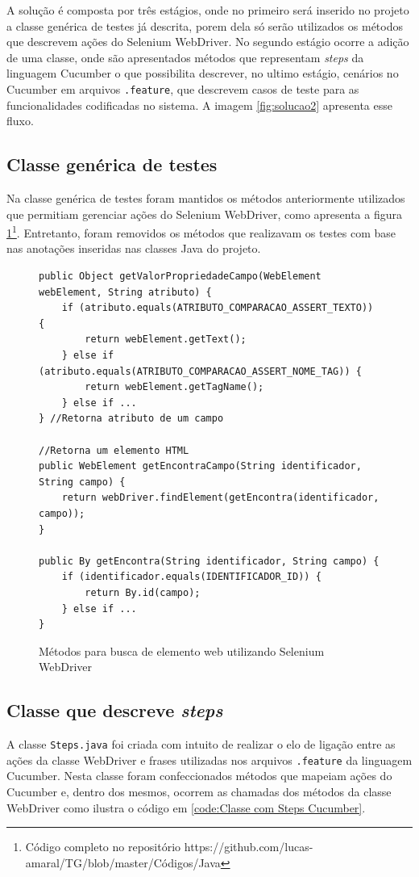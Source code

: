 \documentclass[tg]{mdtufsm}
\begin{document}
A solução é composta por três estágios, onde no primeiro será inserido no projeto a classe genérica de testes já descrita, porem dela só serão utilizados os métodos que descrevem ações do Selenium WebDriver. No segundo estágio ocorre a adição de uma classe, onde são apresentados métodos que representam \emph{steps} da linguagem Cucumber o que possibilita descrever, no ultimo estágio, cenários no Cucumber em arquivos \texttt{.feature}, que descrevem casos de teste para as funcionalidades codificadas no sistema. A imagem \ref{fig:solucao2} apresenta esse fluxo.

\subsection{Classe genérica de testes}
Na classe genérica de testes foram mantidos os métodos anteriormente utilizados que permitiam gerenciar ações do Selenium WebDriver, como apresenta a figura \ref{code:Classe genérica contendo métodos WebDriver}\footnote{Código completo no repositório https://github.com/lucas-amaral/TG/blob/master/Códigos/Java}.
Entretanto, foram removidos os métodos que realizavam os testes com base nas anotações inseridas nas classes Java do projeto.

\begin{figure}[!htt]
	\begin{lstlisting}
public Object getValorPropriedadeCampo(WebElement webElement, String atributo) {
    if (atributo.equals(ATRIBUTO_COMPARACAO_ASSERT_TEXTO)) {
        return webElement.getText();
    } else if (atributo.equals(ATRIBUTO_COMPARACAO_ASSERT_NOME_TAG)) {
        return webElement.getTagName();
    } else if ...
} //Retorna atributo de um campo

//Retorna um elemento HTML
public WebElement getEncontraCampo(String identificador, String campo) { 
    return webDriver.findElement(getEncontra(identificador, campo));
}

public By getEncontra(String identificador, String campo) {
    if (identificador.equals(IDENTIFICADOR_ID)) {
        return By.id(campo);
    } else if ...
}
	\end{lstlisting}
	\caption{Métodos para busca de elemento web utilizando Selenium WebDriver}
	\label{code:Classe genérica contendo métodos WebDriver}
\end{figure}

\subsection{Classe que descreve \emph{steps}}
A classe \texttt{Steps.java} foi criada com intuito de realizar o elo de ligação entre as ações da classe WebDriver e frases utilizadas nos arquivos \texttt{.feature} da linguagem Cucumber. Nesta classe foram confeccionados métodos que mapeiam ações do Cucumber e, dentro dos mesmos, ocorrem as chamadas dos métodos da classe WebDriver como ilustra o código em \ref{code:Classe com Steps Cucumber}.
\end{document}
